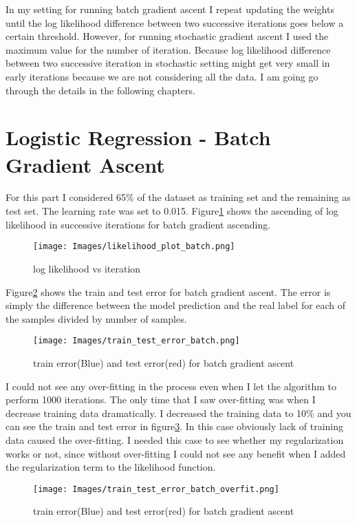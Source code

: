 \documentclass[12pt]{article}
\begin{document}
In my setting for running batch gradient ascent I repeat updating the weights until the log likelihood difference between two successive iterations goes below a certain threshold. However, for running stochastic gradient ascent I used the maximum value for the number of iteration. Because log likelihood difference between two successive iteration in stochastic setting might get very small in early iterations because we are not considering all the data. I am going go through the details in the following chapters.

\section{Logistic Regression - Batch Gradient Ascent}
For this part I considered 65\% of the dataset as training set and the remaining as test set. The learning rate was set to 0.015.
Figure\ref{fig:batch_loglikelihood} shows the ascending of log likelihood in successive iterations for batch gradient ascending.
\begin{figure}
  \caption{log likelihood vs iteration}
  \centering
  \texttt{[image: Images/likelihood\_plot\_batch.png]}
  \label{fig:batch_loglikelihood}
\end{figure}
Figure\ref{fig:batch_train_test} shows the train and test error for batch gradient ascent. The error is simply the difference between the model prediction and the real label for each of the samples divided by number of samples.
\begin{figure}
  \caption{train error(Blue) and test error(red) for batch gradient ascent}
  \centering
  \texttt{[image: Images/train\_test\_error\_batch.png]}
  \label{fig:batch_train_test}
\end{figure}
I could not see any over-fitting in the process even when I let the algorithm to perform 1000 iterations. The only time that I saw over-fitting was when I decrease training data dramatically. I decreased the training data to 10\% and you can see the train and test error in figure\ref{fig:batch_train_test_overfit}. In this case obviously lack of training data caused the over-fitting. I needed this case to see whether my regularization works or not, since without over-fitting I could not see any benefit when I added the regularization term to the likelihood function.
\begin{figure}
  \caption{train error(Blue) and test error(red) for batch gradient ascent}
  \centering
  \texttt{[image: Images/train\_test\_error\_batch\_overfit.png]}
  \label{fig:batch_train_test_overfit}
\end{figure}
\newpage
\end{document}
